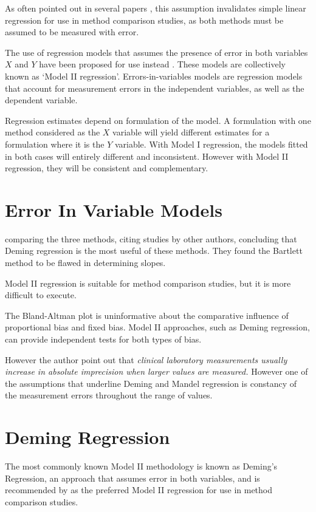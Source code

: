 \documentclass[12pt, a4paper]{report}
\theoremstyle{plain}
\theoremstyle{definition}
\theoremstyle{remark}
\begin{document}
As often pointed out in several papers
\citep{BA83,ludbrook97}, this assumption invalidates simple linear
regression for use in method comparison studies, as both methods
must be assumed to be measured with error.

The use of regression models that assumes the presence of error in
both variables $X$ and $Y$ have been proposed for use instead
\citep{CornCoch,ludbrook97}. These models are collectively
known as `Model II regression'. Errors-in-variables models are regression models that account for measurement errors in the independent variables, as well as the dependent variable.

Regression estimates depend on formulation of the model. A formulation with one method considered as the $X$ variable will yield different estimates for a formulation where it is the $Y$ variable. With Model I regression, the models fitted in both cases will entirely different and inconsistent. However with Model II regression, they will be consistent and complementary.




\section{Error In Variable Models}

	
\citet{CornCoch} comparing the three methods, citing studies by other authors, concluding that Deming regression is the most useful of these methods. They found the Bartlett method to be flawed in determining slopes.
	
Model II regression is suitable for method comparison studies, but it is more difficult to execute. 

The Bland-Altman plot is uninformative about the comparative influence of proportional bias and fixed bias. Model II approaches, such as Deming regression, can provide independent tests for both types of bias.
		
However the author point out that \emph{clinical laboratory measurements usually increase in absolute imprecision when larger values are measured.} However one of the assumptions that underline Deming and Mandel regression is constancy of the measurement errors throughout the range of values.
	
	
\section{Deming Regression}
The most commonly known Model II methodology is known as Deming's Regression, an approach that assumes error in both variables, and is recommended by \citet*{CornCoch} as the preferred Model II regression for use in method comparison studies. 
		
\end{document}
